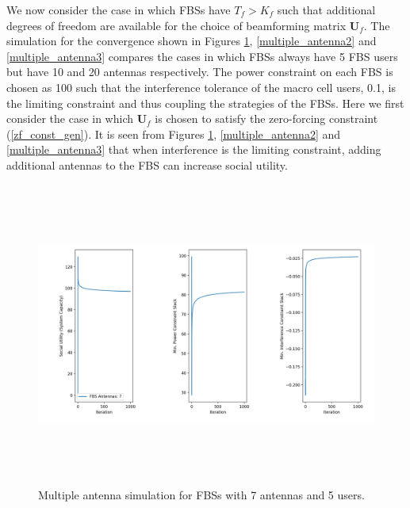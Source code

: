 \documentclass[12pt,a4paper]{report}
\begin{document}
We now consider the case in which FBSs have $T_f > K_f$ such that additional degrees of freedom are available for the choice of beamforming matrix $\mathbf{U}_f$. The simulation for the convergence shown in Figures \ref{multiple_antenna1}, \ref{multiple_antenna2} and \ref{multiple_antenna3} compares the cases in which FBSs always have 5 FBS users but have 10 and 20 antennas respectively. The power constraint on each FBS is chosen as 100 such that the interference tolerance of the macro cell users, 0.1, is the limiting constraint and thus coupling the strategies of the FBSs. Here we first consider the case in which $\mathbf{U}_f$ is chosen to satisfy the zero-forcing constraint (\ref{zf_const_gen}). It is seen from Figures \ref{multiple_antenna1}, \ref{multiple_antenna2} and \ref{multiple_antenna3} that when interference is the limiting constraint, adding additional antennas to the FBS can increase social utility.

\begin{figure}[H]\label{multiple_antenna1}
	\includegraphics[width= 15cm,height = 10cm]{figures/multiple_antenna1}
	  \caption{Multiple antenna simulation for FBSs with 7 antennas and 5 users.}
\end{figure}
\end{document}
